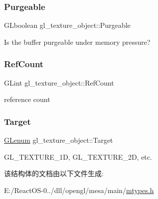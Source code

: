 \subsubsection{\texorpdfstring{Purgeable}{Purgeable}}
{\footnotesize\ttfamily G\+Lboolean gl\+\_\+texture\+\_\+object\+::\+Purgeable}

Is the buffer purgeable under memory pressure? \mbox{\label{structgl__texture__object_a78dfddfbf7e845fbeb3c44bf59b485a5}} 
\subsubsection{\texorpdfstring{Ref\+Count}{RefCount}}
{\footnotesize\ttfamily G\+Lint gl\+\_\+texture\+\_\+object\+::\+Ref\+Count}

reference count \mbox{\label{structgl__texture__object_ad318d8ec752261c1ccb25ce020c74ad9}} 
\subsubsection{\texorpdfstring{Target}{Target}}
{\footnotesize\ttfamily \hyperlink{interfacevoid}{G\+Lenum} gl\+\_\+texture\+\_\+object\+::\+Target}

G\+L\+\_\+\+T\+E\+X\+T\+U\+R\+E\+\_\+1D, G\+L\+\_\+\+T\+E\+X\+T\+U\+R\+E\+\_\+2D, etc. 

该结构体的文档由以下文件生成\+:\begin{DoxyCompactItemize}
\item 
E\+:/\+React\+O\+S-\/0../dll/opengl/mesa/main/\hyperlink{mtypes_8h}{mtypes.\+h}\end{DoxyCompactItemize}
